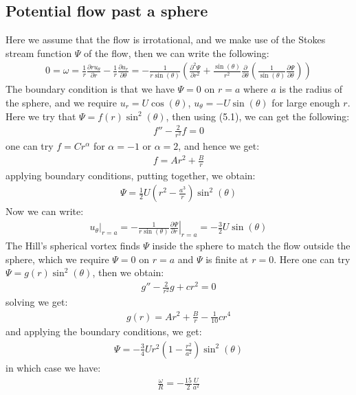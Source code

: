 \documentclass[11pt]{book}
\theoremstyle{break}
\theoremstyle{break}
\newcommand{\pd}{\partial}
\begin{document}
\subsection*{Potential flow past a sphere}
Here we assume that the flow is irrotational, and we make use of the Stokes stream function $\Psi $ of the flow, then we can write the following:
\begin{align}
0 = \omega = \frac{1}{r}\frac{\pd ru_{\theta}}{\pd r} - \frac{1}{r} \frac{\pd u_r}{\pd \theta} = -\frac{1}{r\sin(\theta)}\left(\frac{\partial^2 \Psi}{\partial r^2}+\frac{\sin(\theta)}{r^2}\frac{\partial}{\partial \theta}\left( \frac{1}{\sin(\theta)}\frac{\partial \Psi}{\partial \theta}\right)\right)
\end{align}
The boundary condition is that we have $\Psi = 0$ on $r=a$ where $a$ is the radius of the sphere, and we require $u_r = U \cos(\theta)$, $u_{\theta} = -U \sin(\theta)$ for large enough $r$. Here we try that $\Psi = f(r) \sin^2(\theta)$, then using (5.1), we can get the following:
\begin{align*}
f'' - \frac{2}{r^2}f = 0
\end{align*}
one can try $f = Cr^\alpha$ for $\alpha = -1$ or $\alpha = 2$, and hence we get:
\begin{align*}
f= Ar^2 + \frac{B}{r}
\end{align*}
applying boundary conditions, putting together, we obtain:
\begin{align*}
\Psi = \frac{1}{2}U\left(r^2 -\frac{a^3}{r}\right)\sin^2(\theta)
\end{align*}
Now we can write:
\begin{align*}
u_{\theta}|_{r=a} = -\frac{1}{r\sin(\theta)}\left.\frac{\pd \Psi}{\pd r}\right|_{r=a} = -\frac{3}{2}U \sin(\theta)
\end{align*}
The Hill's spherical vortex finds $\Psi$ inside the sphere to match the flow outside the sphere, which we require $\Psi = 0$ on $r=a$ and $\Psi$ is finite at $r=0$. Here one can try $\Psi = g(r) \sin^2(\theta)$, then we obtain:
\begin{align*}
g'' - \frac{2}{r^2}g + cr^2=0
\end{align*}
solving we get:
\begin{align*}
g(r)= Ar^2+ \frac{B}{r} - \frac{1}{10}cr^4
\end{align*}
and applying the boundary conditions, we get:
\begin{align*}
\Psi = -\frac{3}{4}Ur^2\left( 1 - \frac{r^2}{a^2}\right)\sin^2(\theta)
\end{align*}
in which case we have:
\begin{align*}
\frac{\omega}{R} = -\frac{15}{2} \frac{U}{a^2}
\end{align*}
\end{document}
